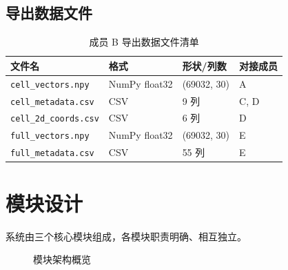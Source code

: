 \documentclass[12pt,a4paper]{ctexart}
\begin{document}
\subsection{导出数据文件}

\begin{table}[H]
\centering
\caption{成员 B 导出数据文件清单}
\begin{tabular}{l|l|l|l}
\toprule
\textbf{文件名} & \textbf{格式} & \textbf{形状/列数} & \textbf{对接成员} \\
\midrule
\texttt{cell\_vectors.npy}     & NumPy float32 & (69032, 30) & A \\
\texttt{cell\_metadata.csv}    & CSV           & 9 列         & C, D \\
\texttt{cell\_2d\_coords.csv}  & CSV           & 6 列         & D \\
\texttt{full\_vectors.npy}     & NumPy float32 & (69032, 30) & E \\
\texttt{full\_metadata.csv}    & CSV           & 55 列        & E \\
\bottomrule
\end{tabular}
\end{table}

\section{模块设计}

系统由三个核心模块组成，各模块职责明确、相互独立。

\begin{figure}[H]
\centering
{}
\caption{模块架构概览}
\end{figure}
\end{document}
